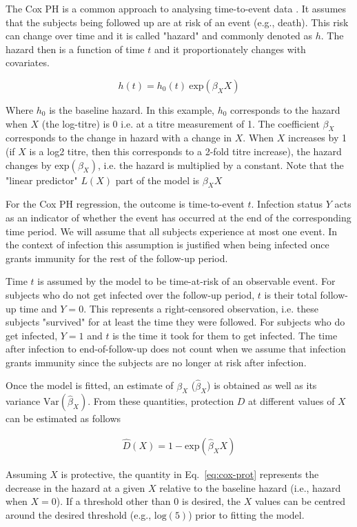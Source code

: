 The Cox PH is a common approach to analysing time-to-event data \cite{George;2014}. It assumes that the subjects being followed up are at risk of an event (e.g., death). This risk can change over time and it is called "hazard" and commonly denoted as $h$. The hazard then is a function of time $t$ and it proportionately changes with covariates.

$$
    h(t) = h_0(t) \ \text{exp}(\beta_XX)
$$

Where $h_0$ is the baseline hazard. In this example, $h_0$ corresponds to the hazard when $X$ (the log-titre) is 0 i.e. at a titre measurement of 1. The coefficient $\beta_X$ corresponds to the change in hazard with a change in $X$. When $X$ increases by 1 (if $X$ is a log2 titre, then this corresponds to a 2-fold titre increase), the hazard changes by $\text{exp}(\beta_X)$, i.e. the hazard is multiplied by a constant. Note that the "linear predictor" $L(X)$ part of the model is $\beta_XX$

For the Cox PH regression, the outcome is time-to-event $t$. Infection status $Y$ acts as an indicator of whether the event has occurred at the end of the corresponding time period. We will assume that all subjects experience at most one event. In the context of infection this assumption is justified when being infected once grants immunity for the rest of the follow-up period.

Time $t$ is assumed by the model to be time-at-risk of an observable event. For subjects who do not get infected over the follow-up period, $t$ is their total follow-up time and $Y=0$. This represents a right-censored observation, i.e. these subjects "survived" for at least the time they were followed. For subjects who do get infected, $Y=1$ and $t$ is the time it took for them to get infected. The time after infection to end-of-follow-up does not count when we assume that infection grants immunity since the subjects are no longer at risk after infection.

Once the model is fitted, an estimate of $\beta_X$ ($\hat{\beta}_X$) is obtained as well as its variance $\text{Var}(\hat{\beta}_X)$. From these quantities, protection $D$ at different values of $X$ can be estimated as follows

\begin{gather}
    \hat{D}(X) = 1 - \text{exp}(\hat{\beta}_X X)
    \label{eq:cox-prot}
\end{gather}

Assuming $X$ is protective, the quantity in Eq.~\ref{eq:cox-prot} represents the decrease in the hazard at a given $X$ relative to the baseline hazard (i.e., hazard when $X=0$). If a threshold other than $0$ is desired, the $X$ values can be centred around the desired threshold (e.g., $\text{log}(5)$) prior to fitting the model.

